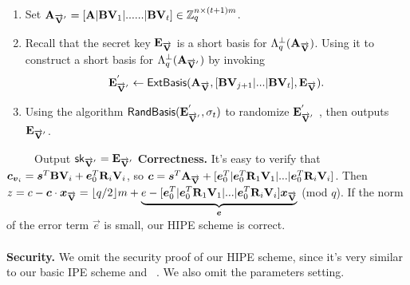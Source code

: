 \documentclass{llncs}
\begin{document}
\begin{appendix}
\begin{enumerate}
\item Set $\mathbf{A}_{\overrightarrow{\mathbf{V}}^{'}}=[\mathbf{A} | \mathbf{B}\mathbf{V}_{1}| ...... | \mathbf{B}\mathbf{V}_{t}] \in \mathbb{Z}^{n \times (t+1)m}_{q}$.\\
\item Recall that the secret key $\mathbf{E}_{\overrightarrow{\mathbf{V}}}$ is a short basis for $\Lambda^{\perp}_{q}(\mathbf{A}_{\overrightarrow{\mathbf{V}}})$. Using it to construct a short basis for $\Lambda^{\perp}_{q}(\mathbf{A}_{\overrightarrow{\mathbf{V}}^{'}})$ by invoking
\begin{equation}
\mathbf{E}^{'}_{\overrightarrow{\mathbf{V}}^{'}} \leftarrow \mathsf{ExtBasis} ( \mathbf{A}_{\overrightarrow{\mathbf{V}}}, [\mathbf{B}\mathbf{V}_{j+1}|...|\mathbf{B}\mathbf{V}_{t}], \mathbf{E}_{\overrightarrow{\mathbf{V}}} ).
\end{equation}
\item Using the algorithm $\mathsf{RandBasis}(\mathbf{E}^{'}_{\overrightarrow{\mathbf{V}}^{'}}, \sigma_{t})$ to randomize $\mathbf{E}^{'}_{\overrightarrow{\mathbf{V}}^{'}}$ , then outputs $\mathbf{E}_{\overrightarrow{\mathbf{V}}^{'}}$.
\end{enumerate}
~~~~~Output $\mathsf{sk}_{\overrightarrow{\mathbf{V}}^{'}}=\mathbf{E}_{\overrightarrow{\mathbf{V}}^{'}}$
\textbf{Correctness.} It's easy to verify that $\boldsymbol{c}_{\boldsymbol{v}_{i}}=\boldsymbol{s}^{T}\mathbf{B}\mathbf{V}_{i}+\boldsymbol{e}^{T}_{0}\mathbf{R}_{i}\mathbf{V}_{i}$, so $\boldsymbol{c}=\boldsymbol{s}^{T}\mathbf{A}_{\overrightarrow{\mathbf{V}}}+[\boldsymbol{e}^{T}_{0}|\boldsymbol{e}^{T}_{0}\mathbf{R}_{1}\mathbf{V}_{1}|...|\boldsymbol{e}^{T}_{0}\mathbf{R}_{i}\mathbf{V}_{i}]$. Then $z=c-\boldsymbol{c}\cdot \boldsymbol{x}_{\overrightarrow{\mathbf{V}}}=\lfloor q/2 \rfloor m+\underbrace{e-[\boldsymbol{e}^{T}_{0}|\boldsymbol{e}^{T}_{0}\mathbf{R}_{1}\mathbf{V}_{1}|...|\boldsymbol{e}^{T}_{0}\mathbf{R}_{i}\mathbf{V}_{i}]\boldsymbol{x}_{\overrightarrow{\mathbf{V}}}}_{\boldsymbol{e}}$ (mod $q$). If the norm of the error term $\vec{e}$ is small, our HIPE scheme is correct.\\
\\
\textbf{Security.} We omit the security proof of our HIPE scheme, since it's very similar to our basic IPE scheme and ~\cite{LC:AbdDeCMoc12}. We also omit the parameters setting.


\end{appendix}
\end{document}
